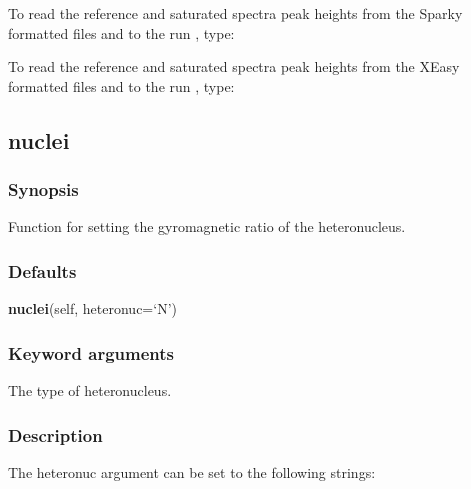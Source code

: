 To read the reference and saturated spectra peak heights from the Sparky formatted files  and  to the run , type:




To read the reference and saturated spectra peak heights from the XEasy formatted files  and  to the run , type:






\newpage

\subsection{nuclei}


\subsubsection{Synopsis}

Function for setting the gyromagnetic ratio of the heteronucleus.



\subsubsection{Defaults}

\textsf{\textbf{nuclei}(self, heteronuc=`N')}


\subsubsection{Keyword arguments}

  The type of heteronucleus. 




\subsubsection{Description}

The heteronuc argument can be set to the following strings:



